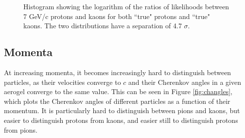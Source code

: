 \begin{figure}[]
\centering
{}
\caption[Particle identification separation for 7 GeV/c kaons and protons]{Histogram showing the logarithm of the ratios of likelihoods between 7 GeV/c protons and kaons for both ``true" protons and ``true" kaons. The two distributions have a separation of  4.7 $\sigma$.}
\label{fig:kaonprotonsep} 
\end{figure}

\subsection{Momenta}

At increasing momenta, it becomes increasingly hard to distinguish between particles, as their velocities converge to $c$ and their Cherenkov angles in a given aerogel converge to the same value. 
This can be seen in Figure \ref{fig:changles}, which plots the Cherenkov angles of different particles as a function of their momentum.
It is particularly hard to distinguish between pions and kaons, but easier to distinguish protons from kaons, and easier still to distinguish protons from pions.

